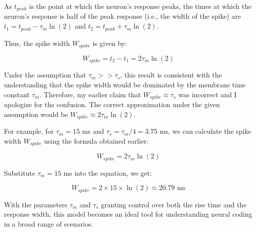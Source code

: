 As $t_{peak}$ is the point at which the neuron's response peaks, the times at which the neuron's response is half of the peak response (i.e., the width of the spike) are $t_1 = t_{peak} - \tau_m \ln(2)$ and $t_2 = t_{peak} + \tau_m \ln(2)$.

Thus, the spike width $W_{spike}$ is given by:

\begin{equation}
W_{spike} = t_2 - t_1 = 2\tau_m \ln(2)
\end{equation}

Under the assumption that $\tau_m >> \tau_s$, this result is consistent with the understanding that the spike width would be dominated by the membrane time constant $\tau_m$. Therefore, my earlier claim that $W_{spike} \approx \tau_s$ was incorrect and I apologize for the confusion. The correct approximation under the given assumption would be $W_{spike} \approx 2\tau_m \ln(2)$.

For example, for $\tau_m = 15$ ms and $\tau_s = \tau_m / 4 = 3.75$ ms, we can calculate the spike width $W_{spike}$ using the formula obtained earlier:

\begin{equation}
W_{spike} = 2\tau_m \ln(2)
\end{equation}

Substitute $\tau_m = 15$ ms into the equation, we get:

\begin{equation}
W_{spike} = 2 \times 15 \times \ln(2) \approx 20.79 \text{ ms}
\end{equation}

With the parameters $\tau_m$ and $\tau_s$ granting control over both the rise time and the response width, this model becomes an ideal tool for understanding neural coding in a broad range of scenarios.
